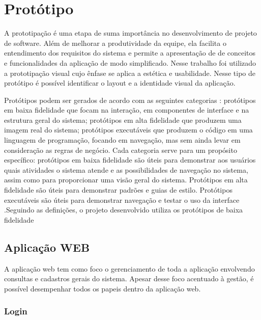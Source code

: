 \chapter{Protótipo}

A prototipação é uma etapa de suma importância no desenvolvimento de projeto de software. Além de melhorar a produtividade da equipe, ela facilita o entendimento dos requisitos do sistema e permite a apresentação de de conceitos e funcionalidades da aplicação de modo simplificado.
Nesse trabalho foi utilizado a prototipação visual cujo ênfase se aplica a estética e usabilidade. Nesse tipo de protótipo é possível identificar o layout e a identidade visual da aplicação. \cite{dextra2013prototipacao}

{Protótipos podem ser gerados de acordo com as seguintes categorias \cite{coyette2004sketchixml}: protótipos em baixa fidelidade que focam na interação, em componentes de interface e na estrutura geral do sistema; protótipos em alta fidelidade que produzem uma imagem real do sistema; protótipos executáveis que produzem o código em uma linguagem de programação, focando em navegação, mas sem ainda levar em consideração as regras de negócio. Cada categoria serve para um propósito específico: protótipos em baixa fidelidade são úteis para demonstrar aos usuários quais atividades o sistema atende e as possibilidades de navegação no sistema, assim como para proporcionar uma visão geral do sistema. Protótipos em alta fidelidade são úteis para demonstrar padrões e guias de estilo. Protótipos executáveis são úteis para demonstrar navegação e testar o uso da interface \cite{rosemberg2008prototipaccao}.Seguindo as definições, o projeto desenvolvido utiliza os protótipos de baixa fidelidade}

\section{Aplicação WEB}
A aplicação web tem como foco o gerenciamento de toda a aplicação envolvendo consultas e cadastros gerais do sistema.
Apesar desse foco acentuado à gestão, é possível desempenhar todos os papeis dentro da aplicação web.

\newpage
\subsection{Login}

